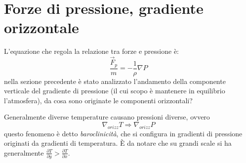 \section{Forze di pressione, gradiente orizzontale}
L'equazione che regola la relazione tra forze e pressione è:
\begin{equation}
	\frac{\vec{F}_p}{m}=-\frac{1}{\rho}\nabla P
\end{equation}
nella sezione precedente è stato analizzato l'andamento della componente verticale del gradiente di pressione (il cui scopo è mantenere in equilibrio l'atmosfera), da cosa sono originate le componenti orizzontali? 

Generalmente diverse temperature causano pressioni diverse, ovvero
\begin{equation*}
	\nabla_{orizz} T \Rightarrow \nabla_{orizz} P
\end{equation*}
questo fenomeno è detto \emph{baroclinicità}, che si configura in gradienti di pressione originati da gradienti di temperatura. È da notare che su grandi scale si ha generalmente $\frac{\partial T}{\partial y} > \frac{\partial T}{\partial x}$.